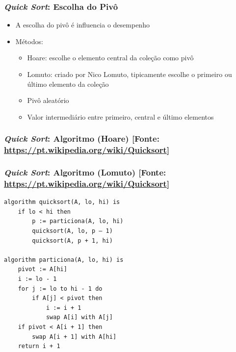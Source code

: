 \documentclass[aspectratio=169]{beamer}
\begin{document}
\begin{frame}[fragile]\frametitle{\emph{Quick Sort}: Escolha do Pivô}
\begin{itemize}
	\item A escolha do pivô é influencia o desempenho
	\item Métodos:
	\begin{itemize}
		\item Hoare: escolhe o elemento central da coleção como pivô
		\item Lomuto: criado por Nico Lomuto, tipicamente escolhe o primeiro ou último elemento da coleção
		\item Pivô aleatório
		\item Valor intermediário entre primeiro, central e último elementos
	\end{itemize}
\end{itemize}
\end{frame}

\begin{frame}[fragile]\frametitle{\emph{Quick Sort}: Algoritmo (Hoare) \tiny{[Fonte: \url{https://pt.wikipedia.org/wiki/Quicksort}]}}
\fontsize{1}{6.5}\selectfont{
\begin{verbatim}
procedimento QuickSort(X[], IniVet, FimVet)
var
   i, j, pivo, aux
início
   i <- IniVet
   j <- FimVet
   pivo <- X[(IniVet + FimVet) div 2]
   enquanto(i <= j)
    |      enquanto (X[i] < pivo) faça
    |       |   i <- i + 1
    |      fimEnquanto
    |      enquanto (X[j] > pivo) faça
    |       |   j <- j - 1
    |      fimEnquanto
    |      se (i <= j) então
    |       |   aux  <- X[i]
    |       |   X[i] <- X[j]
    |       |   X[j] <- aux
    |       |   i <- i + 1
    |       |   j <- j - 1
    |      fimSe
   fimEnquanto
   se (IniVet < j) então
    |  QuickSort(X, IniVet, j)
   fimSe
   se (i < FimVet) então
    |  QuickSort(X, i, FimVet)
   fimSe
fimProcedimento
\end{verbatim}
}
\end{frame}

\begin{frame}[fragile]\frametitle{\emph{Quick Sort}: Algoritmo (Lomuto) \tiny{[Fonte: \url{https://pt.wikipedia.org/wiki/Quicksort}]}}
\scriptsize{
\begin{verbatim}
algorithm quicksort(A, lo, hi) is
    if lo < hi then
        p := particiona(A, lo, hi)
        quicksort(A, lo, p – 1)
        quicksort(A, p + 1, hi)

algorithm particiona(A, lo, hi) is
    pivot := A[hi]
    i := lo - 1    
    for j := lo to hi - 1 do
        if A[j] < pivot then
            i := i + 1
            swap A[i] with A[j]
    if pivot < A[i + 1] then
        swap A[i + 1] with A[hi]
    return i + 1
\end{verbatim}
}
\end{frame}
\end{document}
